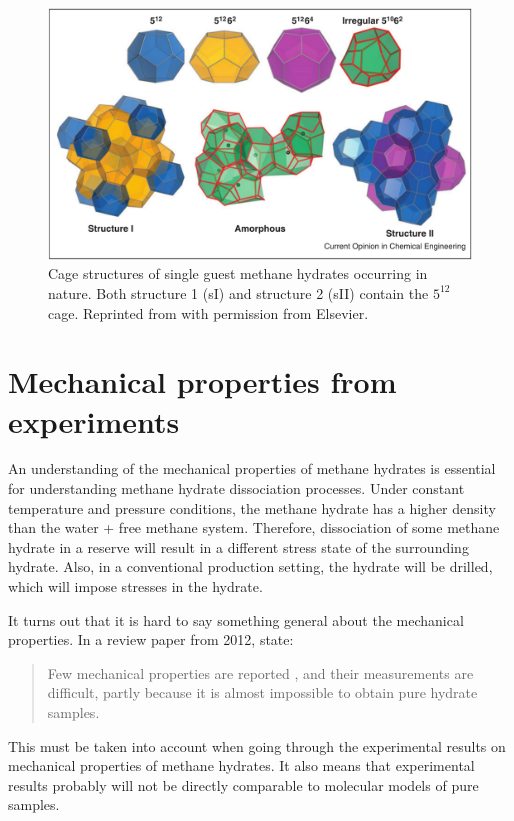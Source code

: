 \begin{figure}
\includegraphics[width=15cm]{../pictures/hydrate_structures.png}
\caption{Cage structures of single guest methane hydrates occurring in nature. Both structure 1 (sI) and structure 2 (sII) contain the $5^{12}$ cage. Reprinted from \citet{Barnes2013} with permission from Elsevier.}
\label{fig:methane_hydrate_structure}
\end{figure}


\section{Mechanical properties from experiments}
An understanding of the mechanical properties of methane hydrates is essential for understanding methane hydrate dissociation processes. Under constant temperature and pressure conditions, the methane hydrate has a higher density than the water + free methane system. Therefore, dissociation of some methane hydrate in a reserve will result in a different stress state of the surrounding hydrate. Also, in a conventional production setting, the hydrate will be drilled, which will impose stresses in the hydrate. 

It turns out that it is hard to say something general about the mechanical properties. In a review paper from 2012, \citet{Ning2012} state:
\begin{quotation}
Few mechanical properties are reported , and their measurements are difficult, partly because it is almost impossible to obtain pure hydrate samples.
\end{quotation}
%
This must be taken into account when going through the experimental results on mechanical properties of methane hydrates. It also means that experimental results probably will not be directly comparable to molecular models of pure samples.

